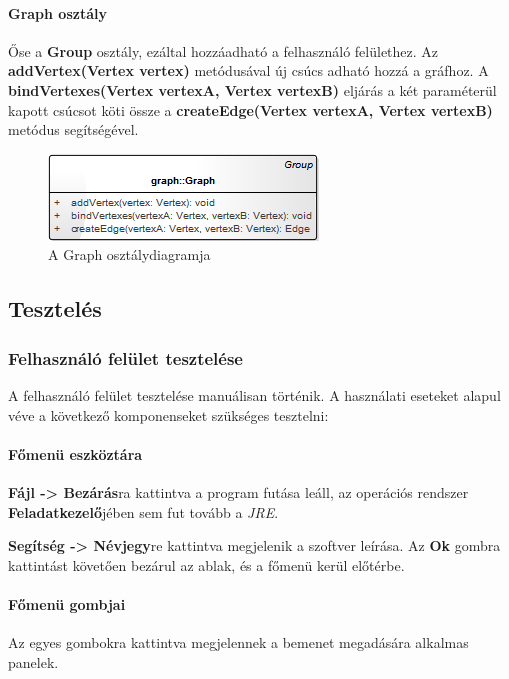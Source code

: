 \documentclass{elteikthesis}
\begin{document}
\paragraph{Graph osztály}
Őse a \textbf{Group} osztály, ezáltal hozzáadható a felhasználó felülethez. Az \textbf{addVertex(Vertex vertex)} metódusával új csúcs adható hozzá a gráfhoz. A \textbf{bindVertexes(Vertex vertexA, Vertex vertexB)} eljárás a két paraméterül kapott csúcsot köti össze a \textbf{createEdge(Vertex vertexA, Vertex vertexB)} metódus segítségével.
\begin{figure}[H]
	\centering
	\includegraphics{pics/class/Graph.png}
	\caption{A Graph osztálydiagramja}
\end{figure}
\subsection{Tesztelés}
\subsubsection{Felhasználó felület tesztelése}
A felhasználó felület tesztelése manuálisan történik. A használati eseteket alapul véve a következő komponenseket szükséges tesztelni:
\paragraph{Főmenü eszköztára}
\textbf{Fájl -> Bezárás}ra kattintva a program futása leáll, az operációs rendszer \textbf{Feladatkezelő}jében sem fut tovább a \emph{JRE}.\par
\textbf{Segítség -> Névjegy}re kattintva megjelenik a szoftver leírása. Az \textbf{Ok} gombra kattintást követően bezárul az ablak, és a főmenü kerül előtérbe.
\paragraph{Főmenü gombjai}
Az egyes gombokra kattintva megjelennek a bemenet megadására alkalmas panelek.
\end{document}
